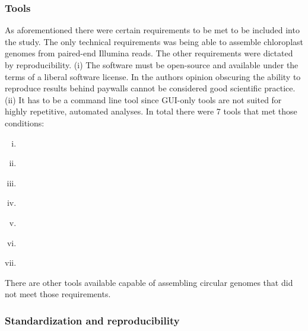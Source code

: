 \subsubsection{Tools}
As aforementioned there were certain requirements to be met to be included into the study. The only technical
requirements was being able to assemble chloroplast genomes from paired-end Illumina reads. The other
requirements were dictated by reproducibility. (i) The software must be open-source and available under the
terms of a liberal software license. In the authors opinion obscuring the ability to reproduce results behind
paywalls cannot be considered good scientific practice. (ii) It has to be a command line tool since GUI-only
tools are not suited for highly repetitive, automated analyses. In total there were 7 tools that met those
conditions:
\begin{enumerate}[(i)]
\item \ce \hspace{0.5ex} \cite{j_ankenbrand_chloroextractor:_2018}
\item \cassp \hspace{0.5ex} \cite{sancho_comparative_2018}
\item \go \hspace{0.5ex} \cite{jin_getorganelle:_2018}
\item \oa \hspace{0.5ex} \cite{coissac_barcodes_2016}
\item \ioga \hspace{0.5ex} \cite{bakker_herbarium_2016}
\item \fp \hspace{0.5ex} \cite{mckain__fast-plast_2017}
\item \np \hspace{0.5ex} \cite{dierckxsens_novoplasty:_2017}
\end{enumerate}

There are other tools available capable of assembling circular genomes that did not meet those requirements.

\subsubsection{Standardization and reproducibility}

